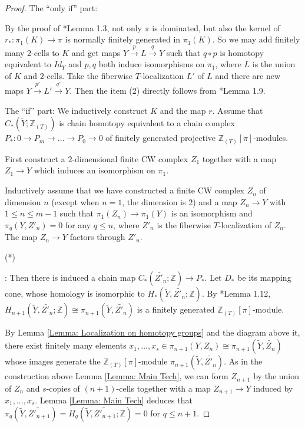 \documentclass[11pt]{amsart}
\theoremstyle{definition}
\numberwithin{equation}{section}
\numberwithin{equation}{section}
\newcommand\ZZ{\mathbb{Z}}
\begin{document}
\begin{proof}
The ``only if'' part: 

By the proof of \cite{Wall-Finiteness-I}*{Lemma 1.3}, not only $\pi$ is dominated, but also the kernel of $r_*:\pi_1(K)\rightarrow \pi$ is normally finitely generated in $\pi_1(K)$. So we may add finitely many $2$-cells to $K$ and get maps $Y\xrightarrow{p} L\xrightarrow{q} Y$ such that $q\circ p$ is homotopy equivalent to $Id_Y$ and $p,q$ both induce isomorphisms on $\pi_1$, where $L$ is the union of $K$ and $2$-cells. Take the fiberwise $T$-localization $L'$ of $L$ and there are new maps $Y\xrightarrow{p'} L'\xrightarrow{q'} Y$. Then the item (2) directly follows from \cite{pedersen2017wallsfinitenessobstruction}*{Lemma 1.9}.

The ``if'' part:
We inductively construct $K$ and the map $r$. Assume that $C_*(\widetilde{Y};\ZZ_{(T)})$ is chain homotopy equivalent to a chain complex $P_*:0\rightarrow P_m\rightarrow ...\rightarrow P_0\rightarrow 0$ of finitely generated projective $\ZZ_{(T)}[\pi]$-modules.

First construct a $2$-dimensional finite CW complex $Z_1$ together with a map $Z_1\rightarrow Y$ which induces an isomorphism on $\pi_1$.

Inductively assume that we have constructed a finite CW complex $Z_n$ of dimension $n$ (except when $n=1$, the dimension is $2$) and a map $Z_n \rightarrow Y$ with $1\leq n\leq m-1$ such that $\pi_1(Z_n)\rightarrow \pi_1(Y)$ is an isomorphism and $\pi_q(Y,Z'_n)=0$ for any $q\leq n$, where $Z'_n$ is the fiberwise $T$-localization of $Z_n$. The map $Z_n\rightarrow Y$ factors through $Z'_n$. 

\hypertarget{Technical-Point}{(*)}: Then there is induced a chain map $C_*(\widetilde{Z'_n};\ZZ)\rightarrow P_*$. Let $D_*$ be its mapping cone, whose homology is isomorphic to $H_*(\widetilde{Y},\widetilde{Z'_n};\ZZ)$. By \cite{pedersen2017wallsfinitenessobstruction}*{Lemma 1.12}, $H_{n+1}(\widetilde{Y},\widetilde{Z'_n};\ZZ)\cong \pi_{n+1}(\widetilde{Y},\widetilde{Z'_n})$ is a finitely generated $\ZZ_{(T)}[\pi]$-module. 

By Lemma \ref{Lemma: Localization on homotopy groups} and the diagram above it, there exist finitely many elements $x_1,...,x_s\in\pi_{n+1}(Y,Z_n)\cong \pi_{n+1}(\widetilde{Y},\widetilde{Z_n})$ whose images generate the $\ZZ_{(T)}[\pi]$-module $\pi_{n+1}(\widetilde{Y},\widetilde{Z'_n})$. As in the construction above Lemma \ref{Lemma: Main Tech}, we can form $Z_{n+1}$ by the union of $Z_n$ and $s$-copies of $(n+1)$-cells together with a map $Z_{n+1}\rightarrow Y$ induced by $x_1,...,x_s$. Lemma \ref{Lemma: Main Tech} deduces that $\pi_q(\widetilde{Y},\widetilde{Z'_{n+1}})=H_q(\widetilde{Y},\widetilde{Z'_{n+1}};\ZZ)=0$ for $q\leq n+1$.


\end{proof}
\end{document}
